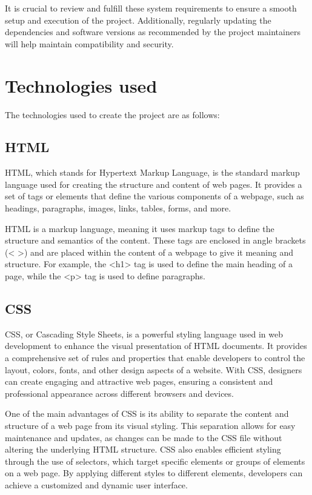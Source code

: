 \documentclass[a4paper,11pt]{report}
\begin{document}
It is crucial to review and fulfill these system requirements to ensure a smooth setup and execution of the project. Additionally, regularly updating the dependencies and software versions as recommended by the project maintainers will help maintain compatibility and security.


\chapter{Technologies used}

The technologies used to create the project are as follows:

\section{HTML}
HTML, which stands for Hypertext Markup Language, is the standard markup language used for creating the structure and content of web pages. It provides a set of tags or elements that define the various components of a webpage, such as headings, paragraphs, images, links, tables, forms, and more.

HTML is a markup language, meaning it uses markup tags to define the structure and semantics of the content. These tags are enclosed in angle brackets (< >) and are placed within the content of a webpage to give it meaning and structure. For example, the <h1> tag is used to define the main heading of a page, while the <p> tag is used to define paragraphs.

\section{CSS}
CSS, or Cascading Style Sheets, is a powerful styling language used in web development to enhance the visual presentation of HTML documents. It provides a comprehensive set of rules and properties that enable developers to control the layout, colors, fonts, and other design aspects of a website. With CSS, designers can create engaging and attractive web pages, ensuring a consistent and professional appearance across different browsers and devices.

One of the main advantages of CSS is its ability to separate the content and structure of a web page from its visual styling. This separation allows for easy maintenance and updates, as changes can be made to the CSS file without altering the underlying HTML structure. CSS also enables efficient styling through the use of selectors, which target specific elements or groups of elements on a web page. By applying different styles to different elements, developers can achieve a customized and dynamic user interface.
\end{document}
